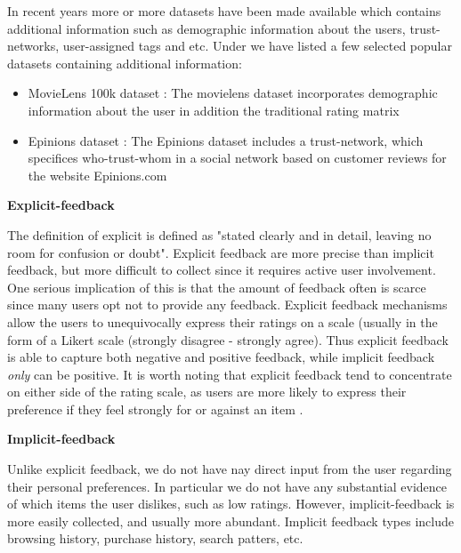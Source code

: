 In recent years more or more datasets have been made available which contains additional information such as demographic information about the users, trust-networks, user-assigned tags and etc. Under we have listed a few selected popular datasets containing additional information:


\begin{itemize}
\item MovieLens 100k dataset \cite{Movielens}: The movielens dataset incorporates demographic information about the user in addition the traditional rating matrix
\item Epinions dataset \cite{Epinions}: The Epinions dataset includes a trust-network, which specifices who-trust-whom in a social network based on customer reviews for the website Epinions.com
\end{itemize}

\textbf{Explicit-feedback}

The definition of explicit is defined as "stated clearly and in detail, leaving no room for confusion or doubt". Explicit feedback are more precise than implicit feedback, but more difficult to collect since it requires active user involvement. One serious implication of this is that the amount of feedback often is scarce since many users opt not to provide any feedback. Explicit feedback mechanisms allow the users to unequivocally express their ratings on a scale (usually in the form of a Likert scale (strongly disagree - strongly agree). Thus explicit feedback is able to capture both negative and positive feedback, while implicit feedback \emph{only} can be positive. It is worth noting that explicit feedback tend to concentrate on either side of the rating scale, as users are more likely to express their preference if they feel strongly for or against an item \cite{Jawaheer2010}.

\textbf{Implicit-feedback}


Unlike explicit feedback, we do not have nay direct input from the user regarding their personal preferences. In particular we do not have any substantial evidence of which items the user dislikes, such as low ratings. However, implicit-feedback is more easily collected, and usually more abundant. Implicit feedback types include browsing history, purchase history, search patters, etc.


